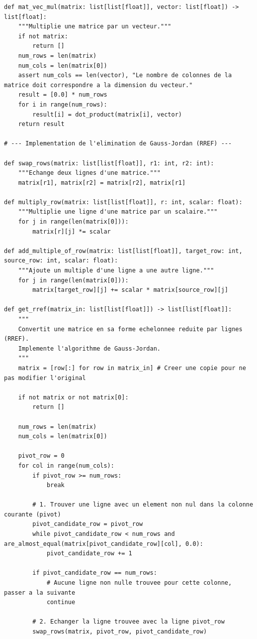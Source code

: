 \documentclass{report}
\begin{document}
\begin{verbatim}
def mat_vec_mul(matrix: list[list[float]], vector: list[float]) -> list[float]:
    """Multiplie une matrice par un vecteur."""
    if not matrix:
        return []
    num_rows = len(matrix)
    num_cols = len(matrix[0])
    assert num_cols == len(vector), "Le nombre de colonnes de la matrice doit correspondre a la dimension du vecteur."
    result = [0.0] * num_rows
    for i in range(num_rows):
        result[i] = dot_product(matrix[i], vector)
    return result

# --- Implementation de l'elimination de Gauss-Jordan (RREF) ---

def swap_rows(matrix: list[list[float]], r1: int, r2: int):
    """Echange deux lignes d'une matrice."""
    matrix[r1], matrix[r2] = matrix[r2], matrix[r1]

def multiply_row(matrix: list[list[float]], r: int, scalar: float):
    """Multiplie une ligne d'une matrice par un scalaire."""
    for j in range(len(matrix[0])):
        matrix[r][j] *= scalar

def add_multiple_of_row(matrix: list[list[float]], target_row: int, source_row: int, scalar: float):
    """Ajoute un multiple d'une ligne a une autre ligne."""
    for j in range(len(matrix[0])):
        matrix[target_row][j] += scalar * matrix[source_row][j]

def get_rref(matrix_in: list[list[float]]) -> list[list[float]]:
    """
    Convertit une matrice en sa forme echelonnee reduite par lignes (RREF).
    Implemente l'algorithme de Gauss-Jordan.
    """
    matrix = [row[:] for row in matrix_in] # Creer une copie pour ne pas modifier l'original

    if not matrix or not matrix[0]:
        return []

    num_rows = len(matrix)
    num_cols = len(matrix[0])

    pivot_row = 0
    for col in range(num_cols):
        if pivot_row >= num_rows:
            break

        # 1. Trouver une ligne avec un element non nul dans la colonne courante (pivot)
        pivot_candidate_row = pivot_row
        while pivot_candidate_row < num_rows and are_almost_equal(matrix[pivot_candidate_row][col], 0.0):
            pivot_candidate_row += 1

        if pivot_candidate_row == num_rows:
            # Aucune ligne non nulle trouvee pour cette colonne, passer a la suivante
            continue

        # 2. Echanger la ligne trouvee avec la ligne pivot_row
        swap_rows(matrix, pivot_row, pivot_candidate_row)


\end{verbatim}
\end{document}
